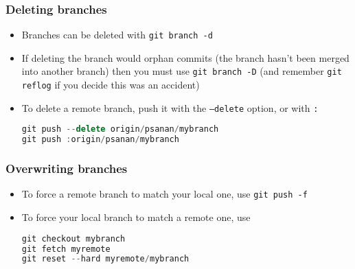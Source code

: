 \documentclass{beamer}
\begin{document}
\begin{frame}[fragile]
\frametitle{Deleting branches}
\begin{itemize}
\item Branches can be deleted with \lstinline{git branch -d}
\item If deleting the branch would orphan commits (the branch hasn't been merged into another branch) then you must use \lstinline{git branch -D} (and remember \lstinline{git reflog} if you decide this was an accident)
\item To delete a remote branch, push it with the \texttt{--delete} option, or with \lstinline{:}
\begin{lstlisting}[language=C++]
git push --delete origin/psanan/mybranch
git push :origin/psanan/mybranch
\end{lstlisting}
\end{itemize}
\end{frame}

\begin{frame}[fragile]
\frametitle{Overwriting branches}
\begin{itemize}
\item To force a remote branch to match your local one, use \lstinline{git push -f}
\item To force your local branch to match a remote one, use
\begin{lstlisting}[language=C++]
git checkout mybranch
git fetch myremote
git reset --hard myremote/mybranch
\end{lstlisting}
\end{itemize}
\end{frame}
\end{document}
